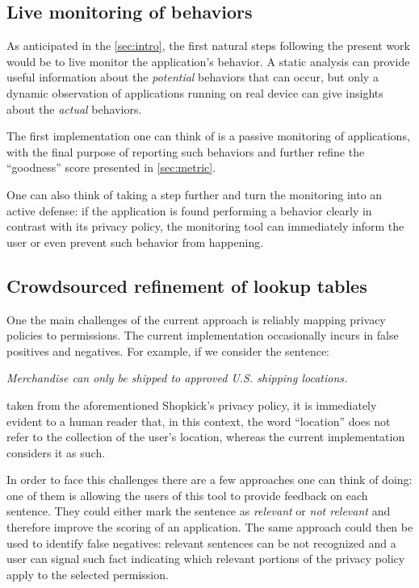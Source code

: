 \documentclass[twoside,letterpaper]{soups}
\theoremstyle{definition}
\begin{document}
\subsection{Live monitoring of behaviors}
As anticipated in the \autoref{sec:intro}, the first natural steps following the present work would be to live monitor the application's behavior. A static analysis can provide useful information about the \emph{potential} behaviors that can occur, but only a dynamic observation of applications running on real device can give insights about the \emph{actual} behaviors.

The first implementation one can think of is a passive monitoring of applications, with the final purpose of reporting such behaviors and further refine the ``goodness'' score presented in \autoref{sec:metric}.

One can also think of taking a step further and turn the monitoring into an active defense: if the application is found performing a behavior clearly in contrast with its privacy policy, the monitoring tool can immediately inform the user or even prevent such behavior from happening.

\subsection{Crowdsourced refinement of lookup tables}
One the main challenges of the current approach is reliably mapping privacy policies to permissions. The current implementation occasionally incurs in false positives and negatives. For example, if we consider the sentence:

\emph{Merchandise can only be shipped to approved U.S. shipping locations.}

taken from the aforementioned Shopkick's privacy policy, it is immediately evident to a human reader that, in this context, the word ``location'' does not refer to the collection of the user's location, whereas the current implementation considers it as such.

In order to face this challenges there are a few approaches one can think of doing: one of them is allowing the users of this tool to provide feedback on each sentence. They could either mark the sentence as \emph{relevant} or \emph{not relevant} and therefore improve the scoring of an application. The same approach could then be used to identify false negatives: relevant sentences can be not recognized and a user can signal such fact indicating which relevant portions of the privacy policy apply to the selected permission.
\end{document}
